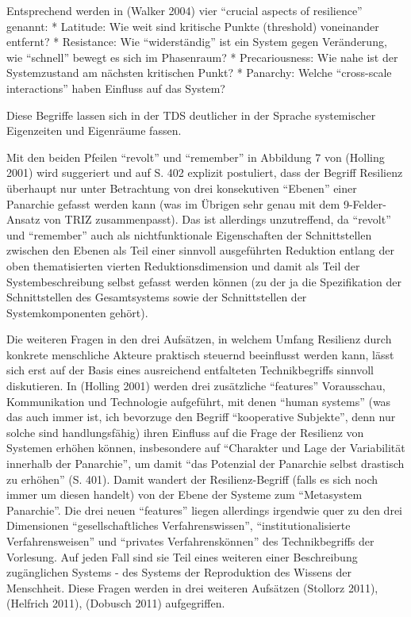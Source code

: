 \documentclass[11pt,a4paper]{article}
\begin{document}
Entsprechend werden in (Walker 2004) vier ``crucial aspects of
resilience'' genannt: * Latitude: Wie weit sind kritische Punkte
(threshold) voneinander entfernt? * Resistance: Wie ``widerständig'' ist
ein System gegen Veränderung, wie ``schnell'' bewegt es sich im
Phasenraum? * Precariousness: Wie nahe ist der Systemzustand am nächsten
kritischen Punkt? * Panarchy: Welche ``cross-scale interactions'' haben
Einfluss auf das System?

Diese Begriffe lassen sich in der TDS deutlicher in der Sprache
systemischer Eigenzeiten und Eigenräume fassen.

Mit den beiden Pfeilen ``revolt'' und ``remember'' in Abbildung 7 von
(Holling 2001) wird suggeriert und auf S. 402 explizit postuliert, dass
der Begriff Resilienz überhaupt nur unter Betrachtung von drei
konsekutiven ``Ebenen'' einer Panarchie gefasst werden kann (was im
Übrigen sehr genau mit dem 9-Felder-Ansatz von TRIZ zusammenpasst). Das
ist allerdings unzutreffend, da ``revolt'' und ``remember'' auch als
nichtfunktionale Eigenschaften der Schnittstellen zwischen den Ebenen
als Teil einer sinnvoll ausgeführten Reduktion entlang der oben
thematisierten vierten Reduktionsdimension und damit als Teil der
Systembeschreibung selbst gefasst werden können (zu der ja die
Spezifikation der Schnittstellen des Gesamtsystems sowie der
Schnittstellen der Systemkomponenten gehört).

Die weiteren Fragen in den drei Aufsätzen, in welchem Umfang Resilienz
durch konkrete menschliche Akteure praktisch steuernd beeinflusst werden
kann, lässt sich erst auf der Basis eines ausreichend entfalteten
Technikbegriffs sinnvoll diskutieren. In (Holling 2001) werden drei
zusätzliche ``features'' Vorausschau, Kommunikation und Technologie
aufgeführt, mit denen ``human systems'' (was das auch immer ist, ich
bevorzuge den Begriff ``kooperative Subjekte'', denn nur solche sind
handlungsfähig) ihren Einfluss auf die Frage der Resilienz von Systemen
erhöhen können, insbesondere auf ``Charakter und Lage der Variabilität
innerhalb der Panarchie'', um damit ``das Potenzial der Panarchie selbst
drastisch zu erhöhen'' (S. 401). Damit wandert der Resilienz-Begriff
(falls es sich noch immer um diesen handelt) von der Ebene der Systeme
zum ``Metasystem Panarchie''. Die drei neuen ``features'' liegen
allerdings irgendwie quer zu den drei Dimensionen ``gesellschaftliches
Verfahrenswissen'', ``institutionalisierte Verfahrensweisen'' und
``privates Verfahrenskönnen'' des Technikbegriffs der Vorlesung. Auf
jeden Fall sind sie Teil eines weiteren einer Beschreibung zugänglichen
Systems - des Systems der Reproduktion des Wissens der Menschheit. Diese
Fragen werden in drei weiteren Aufsätzen (Stollorz 2011), (Helfrich
2011), (Dobusch 2011) aufgegriffen.
\end{document}
